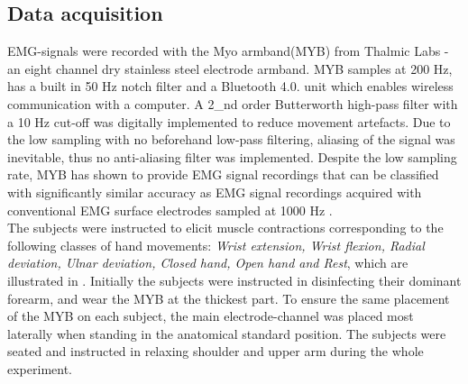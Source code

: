 \subsection{Data acquisition}
EMG-signals were recorded with the Myo armband(MYB) from Thalmic Labs - an eight channel dry stainless steel electrode armband. MYB samples at 200 Hz, has a built in 50 Hz notch filter and a Bluetooth 4.0. unit which enables wireless communication with a computer. A 2_{nd} order Butterworth high-pass filter with a 10 Hz cut-off was digitally implemented to reduce movement artefacts. Due to the low sampling with no beforehand low-pass filtering, aliasing of the signal was inevitable, thus no anti-aliasing filter was implemented. Despite the low sampling rate, MYB has shown to provide EMG signal recordings that can be classified with significantly similar accuracy as EMG signal recordings acquired with conventional EMG surface electrodes sampled at 1000 Hz \cite{Mendez2017}. \\
The subjects were instructed to elicit muscle contractions corresponding to the following classes of hand movements: \textit{Wrist extension, Wrist flexion, Radial deviation, Ulnar deviation, Closed hand, Open hand and Rest}, which are illustrated in . Initially the subjects were instructed in disinfecting their dominant forearm, and wear the MYB at the thickest part. To ensure the same placement of the MYB on each subject, the main electrode-channel was placed most laterally when standing in the anatomical standard position. The subjects were seated and instructed in relaxing shoulder and upper arm during the whole experiment. \\

